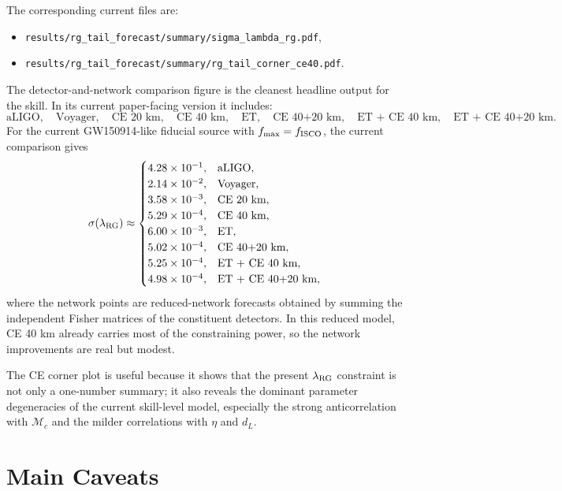 \documentclass[11pt]{article}
\begin{document}
The corresponding current files are:
\begin{itemize}
  \item \texttt{results/rg\_tail\_forecast/summary/sigma\_lambda\_rg.pdf},
  \item \texttt{results/rg\_tail\_forecast/summary/rg\_tail\_corner\_ce40.pdf}.
\end{itemize}

The detector-and-network comparison figure is the cleanest headline output for
the skill. In its current paper-facing version it includes:
\begin{equation}
  \text{aLIGO},\quad
  \text{Voyager},\quad
  \text{CE 20 km},\quad
  \text{CE 40 km},\quad
  \text{ET},\quad
  \text{CE 40+20 km},\quad
  \text{ET + CE 40 km},\quad
  \text{ET + CE 40+20 km}.
\end{equation}
For the current GW150914-like fiducial source with
\(f_{\max}=f_{\rm ISCO}\), the current comparison gives
\begin{equation}
  \sigma(\lambda_{\rm RG})
  \approx
  \begin{cases}
    4.28\times 10^{-1}, & \text{aLIGO}, \\
    2.14\times 10^{-2}, & \text{Voyager}, \\
    3.58\times 10^{-3}, & \text{CE 20 km}, \\
    5.29\times 10^{-4}, & \text{CE 40 km}, \\
    6.00\times 10^{-3}, & \text{ET}, \\
    5.02\times 10^{-4}, & \text{CE 40+20 km}, \\
    5.25\times 10^{-4}, & \text{ET + CE 40 km}, \\
    4.98\times 10^{-4}, & \text{ET + CE 40+20 km},
  \end{cases}
\end{equation}
where the network points are reduced-network forecasts obtained by summing the
independent Fisher matrices of the constituent detectors.
In this reduced model, CE 40 km already carries most of the constraining power,
so the network improvements are real but modest.

The CE corner plot is useful because it shows that the present
\(\lambda_{\rm RG}\) constraint is not only a one-number summary; it also
reveals the dominant parameter degeneracies of the current skill-level model,
especially the strong anticorrelation with \(\mathcal M_c\) and the milder
correlations with \(\eta\) and \(d_L\).

\section{Main Caveats}
\end{document}
